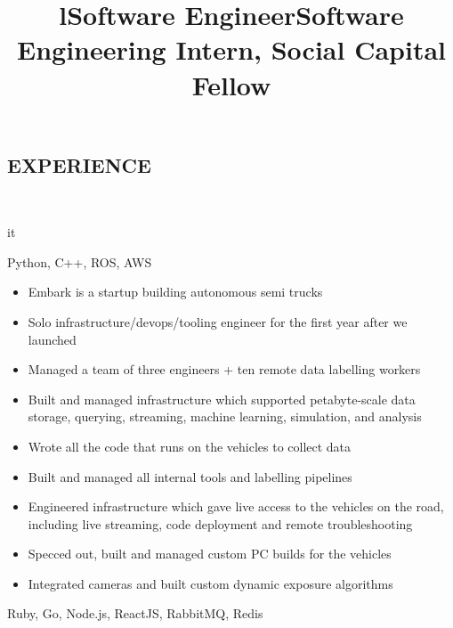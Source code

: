 \documentclass[]{res}
\begin{document}
\begin{resume}
\section{EXPERIENCE}
  \begin{format}  \\ \title{l}{it} \\ \body \end{format}
  \title{Software Engineer}
  \begin{position}
    \begin{description}
      \item Python, C++, ROS, AWS
    \end{description}
    \begin{itemize}
      \item Embark is a startup building autonomous semi trucks
      \item Solo infrastructure/devops/tooling engineer for the first year after we launched
      \item Managed a team of three engineers + ten remote data labelling workers
      \item Built and managed infrastructure which supported petabyte-scale data storage, querying, streaming, machine learning, simulation, and analysis
      \item Wrote all the code that runs on the vehicles to collect data
      \item Built and managed all internal tools and labelling pipelines
      \item Engineered infrastructure which gave live access to the vehicles on the road, including
        live streaming, code deployment and remote troubleshooting
      \item Specced out, built and managed custom PC builds for the vehicles
      \item Integrated cameras and built custom dynamic exposure algorithms
    \end{itemize}
  \end{position}
  \title{Software Engineering Intern, Social Capital Fellow}
  \begin{position}
    \begin{description}
      \item Ruby, Go, Node.js, ReactJS, RabbitMQ, Redis

\end{description}
\end{position}
\end{resume}
\end{document}
